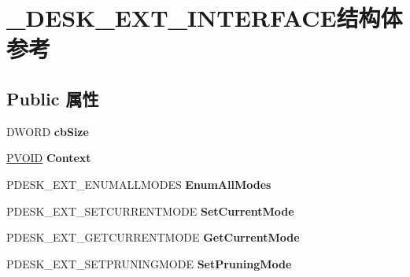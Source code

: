 \hypertarget{struct___d_e_s_k___e_x_t___i_n_t_e_r_f_a_c_e}{}\section{\+\_\+\+D\+E\+S\+K\+\_\+\+E\+X\+T\+\_\+\+I\+N\+T\+E\+R\+F\+A\+C\+E结构体 参考}
\label{struct___d_e_s_k___e_x_t___i_n_t_e_r_f_a_c_e}
\subsection*{Public 属性}
\begin{DoxyCompactItemize}
\item 
\mbox{\label{struct___d_e_s_k___e_x_t___i_n_t_e_r_f_a_c_e_ac5e9fbd4cbf85cc023672d785bb01d72}} 
D\+W\+O\+RD {\bfseries cb\+Size}
\item 
\mbox{\label{struct___d_e_s_k___e_x_t___i_n_t_e_r_f_a_c_e_a25e8dee53c3bef8d960e50cc3c4c7ac3}} 
\hyperlink{interfacevoid}{P\+V\+O\+ID} {\bfseries Context}
\item 
\mbox{\label{struct___d_e_s_k___e_x_t___i_n_t_e_r_f_a_c_e_a94609ce98fba43aef8b8525e37fe9826}} 
P\+D\+E\+S\+K\+\_\+\+E\+X\+T\+\_\+\+E\+N\+U\+M\+A\+L\+L\+M\+O\+D\+ES {\bfseries Enum\+All\+Modes}
\item 
\mbox{\label{struct___d_e_s_k___e_x_t___i_n_t_e_r_f_a_c_e_a482054460547524ca8395f1fc52ad001}} 
P\+D\+E\+S\+K\+\_\+\+E\+X\+T\+\_\+\+S\+E\+T\+C\+U\+R\+R\+E\+N\+T\+M\+O\+DE {\bfseries Set\+Current\+Mode}
\item 
\mbox{\label{struct___d_e_s_k___e_x_t___i_n_t_e_r_f_a_c_e_a354c2c755ef93549829a8adf63815d34}} 
P\+D\+E\+S\+K\+\_\+\+E\+X\+T\+\_\+\+G\+E\+T\+C\+U\+R\+R\+E\+N\+T\+M\+O\+DE {\bfseries Get\+Current\+Mode}
\item 
\mbox{\label{struct___d_e_s_k___e_x_t___i_n_t_e_r_f_a_c_e_a82c000297903b80b83b81a51568c91dc}} 
P\+D\+E\+S\+K\+\_\+\+E\+X\+T\+\_\+\+S\+E\+T\+P\+R\+U\+N\+I\+N\+G\+M\+O\+DE {\bfseries Set\+Pruning\+Mode}

\end{DoxyCompactItemize}
